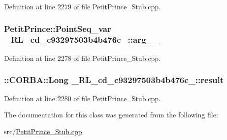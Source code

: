 Definition at line 2279 of file Petit\+Prince\+\_\+\+Stub.\+cpp.

\subsubsection[{\texorpdfstring{arg\+\_\+1\+\_\+}{arg_1_}}]{\setlength{\rightskip}{0pt plus 5cm}Petit\+Prince\+::\+Point\+Seq\+\_\+var \+\_\+R\+L\+\_\+cd\+\_\+c93297503b4b476c\+\_\+::arg\+\_\+\_\+}\hypertarget{class__0_r_l__cd__c93297503b4b476c__51000000_a20400a7189ab950f2440a9eff1293092}{}\label{class__0_r_l__cd__c93297503b4b476c__51000000_a20400a7189ab950f2440a9eff1293092}


Definition at line 2278 of file Petit\+Prince\+\_\+\+Stub.\+cpp.

\subsubsection[{\texorpdfstring{result}{result}}]{\setlength{\rightskip}{0pt plus 5cm}\+::C\+O\+R\+B\+A\+::\+Long \+\_\+R\+L\+\_\+cd\+\_\+c93297503b4b476c\+\_\+::result}\hypertarget{class__0_r_l__cd__c93297503b4b476c__51000000_a670d0d3e4c907d3c2a1e627ed061c956}{}\label{class__0_r_l__cd__c93297503b4b476c__51000000_a670d0d3e4c907d3c2a1e627ed061c956}


Definition at line 2280 of file Petit\+Prince\+\_\+\+Stub.\+cpp.



The documentation for this class was generated from the following file\+:\begin{DoxyCompactItemize}
\item 
src/\hyperlink{_petit_prince___stub_8cpp}{Petit\+Prince\+\_\+\+Stub.\+cpp}\end{DoxyCompactItemize}
